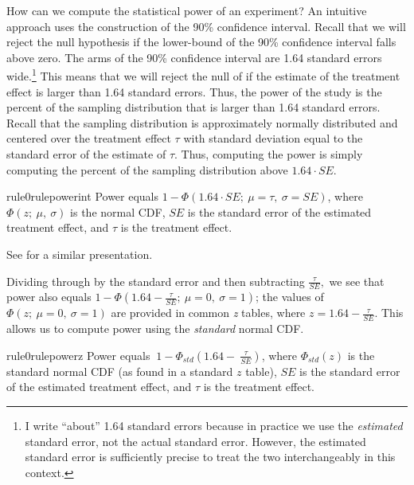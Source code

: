 \documentclass[12pt]{article}
\begin{document}
How can we compute the statistical power of an experiment? 
An intuitive approach uses the construction of the 90\% confidence interval. 
Recall that we will reject the null hypothesis if the lower-bound of the 90\% confidence interval falls above zero. 
The arms of the 90\% confidence interval are 1.64 standard errors wide.\footnote{
  I write ``about'' 1.64 standard errors because in practice we use the \emph{estimated} standard error, not the actual standard error. 
  However, the estimated standard error is sufficiently precise to treat
  the two interchangeably in this context.
  }
This means that we will reject the null of if the estimate of the treatment effect is larger than 1.64 standard errors. 
Thus, the power of the study is the percent of the sampling distribution that is larger than 1.64 standard errors. 
Recall that the sampling distribution is approximately normally distributed and centered over the treatment effect $\tau$ with standard deviation equal to the standard error of the estimate of $\tau$. 
Thus, computing the power is simply computing the percent of the sampling distribution above $1.64 \cdot SE$.



\begin{restatable}{rule0}{rulepowerint}
\label{rule:power-int}
Power equals $1 - \Phi(1.64 \cdot SE;\ \mu = \tau,\ \sigma = SE)$, where $\Phi(z;\ \mu,\ \sigma)$ is the normal CDF, $SE$ is the standard error of the estimated treatment effect, and $\tau$ is the treatment effect.
\end{restatable}

\noindent See \citet[92]{Gerber2012} for a similar presentation.

Dividing through by the standard error and then subtracting $\frac{\tau}{SE},$ we see that power also equals $1 - \Phi\left( 1.64 - \frac{\tau}{SE};\ \mu = 0,\ \sigma = 1 \right)$; the values of $\Phi\left(z;\ \mu = 0,\ \sigma = 1 \right)$ are provided in common \emph{z} tables, where $z = 1.64 - \frac{\tau}{SE}$. 
This allows us to compute power using the \emph{standard} normal CDF.

\begin{restatable}{rule0}{rulepowerz}
\label{rule:power-z}
Power equals $\ 1 - \Phi_{std}\left( 1.64 - \ \frac{\tau}{SE} \right)$, where $\Phi_{std}(z)$ is the standard normal CDF (as found in a standard $z$ table), $SE$ is the standard error of the estimated treatment effect, and $\tau$ is the treatment effect.
\end{restatable}
\end{document}
